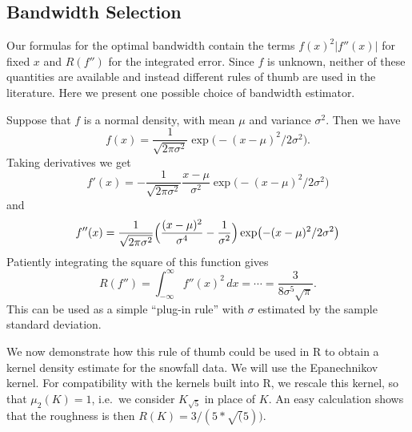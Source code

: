 \documentclass[
  a4paper,
]{article}
\theoremstyle{definition}
\theoremstyle{definition}
\theoremstyle{definition}
\theoremstyle{definition}
\theoremstyle{remark}
\begin{document}
\subsection{Bandwidth Selection}\label{bwsel}

Our formulas for the optimal bandwidth contain the terms
\(f(x)^2 |f''(x)|\) for fixed \(x\) and \(R(f'')\) for the integrated error.
Since \(f\) is unknown, neither of these quantities are available and instead
different rules of thumb are used in the literature. Here we present
one possible choice of bandwidth estimator.

Suppose that \(f\) is a normal density, with mean \(\mu\) and variance \(\sigma^2\).
Then we have
\begin{equation*}
  f(x)
  = \frac{1}{\sqrt{2\pi\sigma^2}} \exp\bigl( - (x-\mu)^2 / 2\sigma^2 \bigr).
\end{equation*}
Taking derivatives we get
\begin{equation*}
  f'(x)
  = - \frac{1}{\sqrt{2\pi\sigma^2}} \frac{x-\mu}{\sigma^2} \exp\bigl( - (x-\mu)^2 / 2\sigma^2 \bigr)
\end{equation*}
and
\begin{equation*}
  f''(x)
  = \frac{1}{\sqrt{2\pi\sigma^2}}
      \Bigl( \frac{(x-\mu)^2}{\sigma^4} - \frac{1}{\sigma^2} \Bigr)
      \exp\bigl( - (x-\mu)^2 / 2\sigma^2 \bigr)
\end{equation*}
Patiently integrating the square of this function gives
\begin{equation*}
  R(f'')
  = \int_{-\infty}^\infty f''(x)^2 \,dx
  = \cdots
  = \frac{3}{8\sigma^5\sqrt{\pi}}.
\end{equation*}
This can be used as a simple ``plug-in rule'' with \(\sigma\) estimated by the
sample standard deviation.

We now demonstrate how this rule of thumb could be used in R to obtain a kernel
density estimate for the snowfall data. We will use the Epanechnikov kernel.
For compatibility with the kernels built into R, we rescale this kernel, so
that \(\mu_2(K) = 1\), i.e.~we consider \(K_{\sqrt{5}}\) in place of \(K\). An easy
calculation shows that the roughness is then \(R(K) = 3 / (5*\sqrt(5))\).
\end{document}
